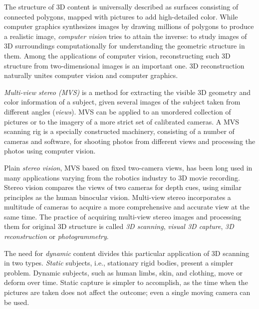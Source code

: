 The structure of 3D content is universally described as surfaces consisting of connected polygons, mapped with pictures to add high-detailed color.
While computer graphics synthesizes images by drawing millions of polygons to produce a realistic image, \emph{computer vision} tries to attain the inverse:
to study images of 3D surroundings computationally for understanding the geometric structure in them.
Among the applications of computer vision, reconstructing such 3D structure from two-dimensional images is an important one.
3D reconstruction naturally unites computer vision and computer graphics.


\emph{Multi-view stereo (MVS)} \cite{hartley03multiview} is a method for extracting the visible 3D geometry and color information of a subject, given several images of the subject taken from different angles (\emph{views}).
MVS can be applied to an unordered collection of pictures or to the imagery of a more strict set of calibrated cameras.
A MVS scanning rig is a specially constructed machinery, consisting of a number of cameras and software, for shooting photos from different views and processing the photos using computer vision.


Plain \emph{stereo vision}, MVS based on fixed two-camera views, has been long used in many applications varying from the robotics industry to 3D movie recording.
Stereo vision compares the views of two cameras for depth cues, using similar principles as the human binocular vision.
Multi-view stereo incorporates a multitude of cameras to acquire a more comprehensive and accurate view at the same time.
The practice of acquiring multi-view stereo images and processing them for original 3D structure is called \emph{3D scanning}, \emph{visual 3D capture}, \emph{3D reconstruction} or \emph{photogrammetry}.


The need for \emph{dynamic} content divides this particular application of 3D scanning in two types.
\emph{Static} subjects, i.e., stationary rigid bodies, present a simpler problem.
Dynamic subjects, such as human limbs, skin, and clothing, move or deform over time.
Static capture is simpler to accomplish, as the time when the pictures are taken does not affect the outcome; even a single moving camera can be used.


